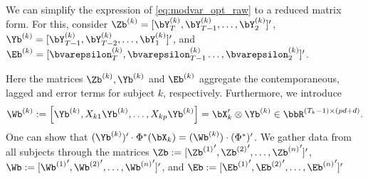 We can simplify the expression of \eqref{eq:modvar_opt_raw} to a reduced matrix form. For this, consider $ \Zb^{(k)} = [\bY^{(k)}_T, \bY^{(k)}_{T-1},\ldots,\bY^{(k)}_{2}]'$,  $\Yb^{(k)} =  [\bY^{(k)}_{T-1}, \bY^{(k)}_{T-2}, \ldots ,\bY^{(k)}_{1}]'$, and $\Eb^{(k)} = [\bvarepsilon^{(k)}_{T} , \bvarepsilon^{(k)}_{T-1} \ldots , \bvarepsilon^{(k)}_{2}]'$.

Here the matrices $\Zb^{(k)}, \Yb^{(k)}$ and $\Eb^{(k)}$ aggregate the contemporaneous, lagged and error terms for subject $k$, respectively. Furthermore, we introduce
\begin{equation*}
    \Wb^{(k)} := \left[\Yb^{(k)} , X_{k1}\Yb^{(k)} , \dots , X_{kp}\Yb^{(k)} \right] = \bX_k' \otimes \Yb^{(k)} \in \bbR^{(T_k-1) \times (pd + d)}.
\end{equation*}
One can show that $ (\Yb^{(k)})' \cdot\Phi^*(\bX_k)  =   (\Wb^{(k)})\cdot  (\Phi^*)' $. We gather data from all subjects through the matrices $\Zb := [{\Zb^{(1)}}' , {\Zb^{(2)}}' , \ldots , {\Zb^{(n)}}']'$, $\Wb :=  [{\Wb^{(1)}}', {\Wb^{(2)}}', \ldots , {\Wb^{(n)}}']'$, and $\Eb := [{\Eb^{(1)}}' , {\Eb^{(2)}}' , \ldots , {\Eb^{(n)}}']'$
